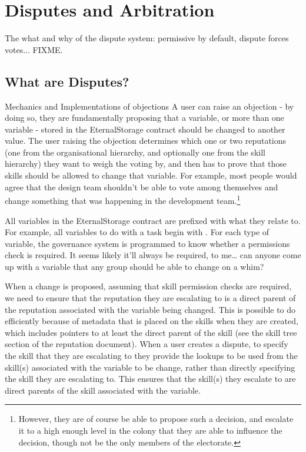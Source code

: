 \section{Disputes and Arbitration}\label{sec:disputes}

The what and why of the dispute system: permissive by default, dispute forces votes... FIXME.

\subsection{What are Disputes?}


Mechanics and Implementations of objections
A user can raise an objection - by doing so, they are fundamentally proposing that a variable, or more than one variable - stored in the EternalStorage contract should be changed to another value. The user raising the objection determines which one or two reputations (one from the organisational hierarchy, and optionally one from the skill hierarchy) they want to weigh the voting by, and then has to prove that those skills should be allowed to change that variable. For example, most people would agree that the design team shouldn’t be able to vote among themselves and change something that was happening in the development team.\footnote{However, they are of course be able to propose such a decision, and escalate it to a high enough level in the colony that they are able to influence the decision, though not be the only members of the electorate.}

All variables in the EternalStorage contract are prefixed with what they relate to. For example, all variables to do with a task begin with . For each type of variable, the governance system is programmed to know whether a permissions check is required. It seems likely it'll always be required, to me… can anyone come up with a variable that any group should be able to change on a whim?

When a change is proposed, assuming that skill permission checks are required, we need to ensure that the reputation they are escalating to is a direct parent of the reputation associated with the variable being changed. This is possible to do efficiently because of metadata that is placed on the skills when they are created, which includes pointers to at least the direct parent of the skill (see the skill tree section of the reputation document). When a user creates a dispute, to specify the skill that they are escalating to they provide the lookups to be used from the skill(s) associated with the variable to be change, rather than directly specifying the skill they are escalating to. This ensures that the skill(s) they escalate to are direct parents of the skill associated with the variable.

